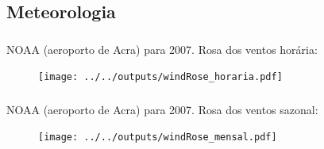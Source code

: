 \subsection{Meteorologia}

\begin{frame}
	\frametitle{}
NOAA (aeroporto de Acra) para 2007. Rosa dos ventos horária: 
	\begin{figure}[H]
		\centering
		\texttt{[image: ../../outputs/windRose\_horaria.pdf]}
	\end{figure}
\end{frame}

\begin{frame}
	\frametitle{}
	NOAA (aeroporto de Acra) para 2007. Rosa dos ventos sazonal: 
	\begin{figure}[H]
	\centering
		\texttt{[image: ../../outputs/windRose\_mensal.pdf]}
    \end{figure}
\end{frame}

